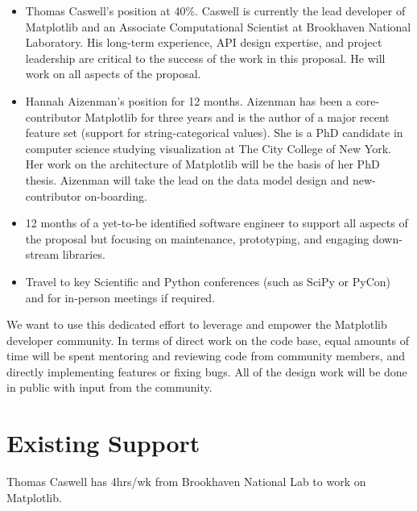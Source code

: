 \documentclass[11pt]{article}  %
\begin{document}
\begin{itemize}[noitemsep]

\item Thomas Caswell's position at 40\%.  Caswell is
  currently the lead developer of Matplotlib and an Associate
  Computational Scientist at Brookhaven National Laboratory.  His
  long-term experience, API design expertise, and project leadership
  are critical to the success of the work in this proposal.  He will work
  on all aspects of the proposal.
\item Hannah Aizenman's position for 12 months.  Aizenman has
  been a core-contributor Matplotlib for three years and is the author
  of a major recent feature set (support for string-categorical values).  She
  is a PhD candidate in computer science studying visualization at The
  City College of New York.  Her work on the architecture of
  Matplotlib will be the basis of her PhD thesis.  Aizenman will take
  the lead on the data model design and new-contributor on-boarding.
\item 12 months of a yet-to-be identified software engineer to
  support all aspects of the proposal but focusing on maintenance,
  prototyping, and engaging down-stream libraries.
\item Travel to key Scientific and Python conferences (such as SciPy
  or PyCon) and for in-person meetings if required.
\end{itemize}

We want to use this dedicated effort to leverage and empower the
Matplotlib developer community.  In terms of direct work on the code
base, equal amounts of time will be spent mentoring and reviewing
code from community members, and directly implementing features
or fixing bugs.  All of the design work will be done in public with
input from the community.



\section{Existing Support}

Thomas Caswell has 4hrs/wk from Brookhaven National Lab to work on
Matplotlib.


\clearpage

\end{document}
